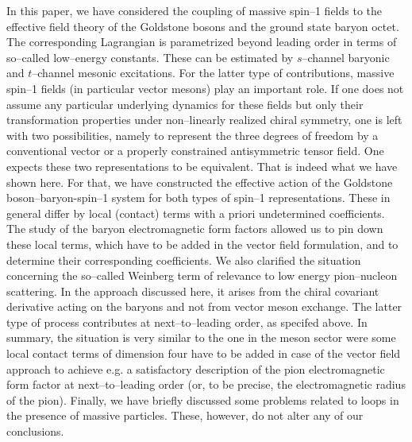 In this paper, we have considered the coupling of massive spin--1
fields to the effective field theory of the Goldstone bosons and
the ground state baryon octet. The corresponding Lagrangian is
parametrized beyond
leading order in terms of so--called low--energy constants. These can
be estimated by $s$--channel baryonic  and $t$--channel mesonic
excitations. For the latter type of contributions, massive
spin--1 fields (in particular vector mesons) play an important role.
If one does not assume any particular underlying dynamics for these
fields but only their transformation properties under non--linearly
realized chiral symmetry, one is left with two possibilities, namely
to represent the three degrees of freedom by a conventional vector or
a properly constrained antisymmetric tensor field. One expects these
two representations to be equivalent. That is indeed what we have shown
here. For that, we have constructed the effective action of the
Goldstone boson--baryon-spin--1 system for both types of spin--1
representations. These in general differ by local (contact) terms with
a priori undetermined coefficients.
The study of the baryon electromagnetic form factors allowed us to pin
down these local terms, which have to be added in the vector field
formulation, and to determine their corresponding coefficients. We also
clarified the situation concerning the so--called Weinberg term of
relevance to low energy pion--nucleon scattering. In
the approach discussed here, it arises from the chiral covariant
derivative acting on the baryons and not from vector meson
exchange. The latter type of process contributes at next--to--leading
order, as specifed above. In summary, the situation is very similar to
the one in the meson sector were some local contact terms of dimension
four have to be added in case of the vector field approach to achieve
e.g. a satisfactory description of the pion electromagnetic form
factor at next--to--leading order \cite{reso1} (or, to be precise, the
electromagnetic radius of the pion). Finally, we have briefly
discussed some problems related to loops in the presence of massive
particles. These, however, do not alter any of our conclusions.

\vfill


\appendix

